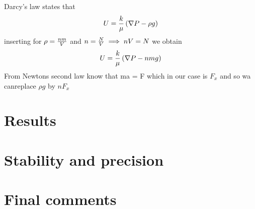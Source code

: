 \documentclass[a4paper,english, 10pt, twoside]{article}
\begin{document}
Darcy's law states that
$$
U = {k\over\mu}\left(\nabla P - \rho g\right)
$$
inserting for $\rho = {nm\over V}$ and $n = {N\over V}\implies nV = N$ we obtain
$$
U = {k\over\mu}\left(\nabla P - nmg\right)
$$
From Newtons second law know that ma = F which in our case is $F_x$ and so wa canreplace $\rho g$ by 
$nF_x$ 

\section{Results}

% 

\section{Stability and precision}

\section{Final comments}

% 
% 
% 
\end{document}

